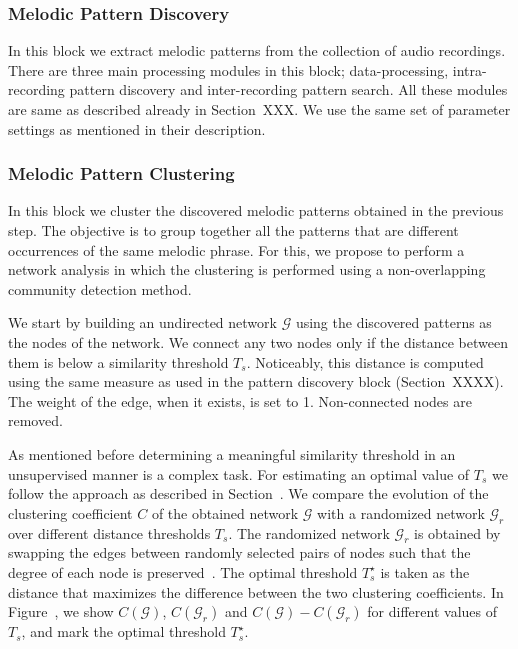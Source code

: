 \subsubsection{Melodic Pattern Discovery}
\label{sec:vsm_feature_extraction_pattern_discovery}
In this block we extract melodic patterns from the collection of audio recordings. There are three main processing modules in this block; data-processing, intra-recording pattern discovery and inter-recording pattern search. All these modules are same as described already in Section~XXX. We use the same set of parameter settings as mentioned in their description.

\subsubsection{Melodic Pattern Clustering}
\label{sec:vsm_feature_extraction_pattern_clustering}

In this block we cluster the discovered melodic patterns obtained in the previous step. The objective is to group together all the patterns that are different occurrences of the same melodic phrase. For this, we propose to perform a network analysis in which the clustering is performed using a non-overlapping community detection method. 

We start by building an undirected network $\mathcal{G}$ using the discovered patterns as the nodes of the network. We connect any two nodes only if the distance between them is below a similarity threshold $T_s$. Noticeably, this distance is computed using the same measure as used in the pattern discovery block (Section~XXXX). The weight of the edge, when it exists, is set to 1. Non-connected nodes are removed.

As mentioned before determining a meaningful similarity threshold in an unsupervised manner is a complex task. For estimating an optimal value of $T_s$ we follow the approach as described in Section~. We compare the evolution of the clustering coefficient $C$ of the obtained network $\mathcal{G}$ with a randomized network $\mathcal{G}_r$ over different distance thresholds $T_s$. The randomized network $\mathcal{G}_r$ is obtained by swapping the edges between randomly selected pairs of nodes such that the degree of each node is preserved~\cite{maslov2002specificity}. The optimal threshold $T_{s}^\star$ is taken as the distance that maximizes the difference between the two clustering coefficients.  In Figure~, we show $C(\mathcal{G})$, $C(\mathcal{G}_r)$ and $C(\mathcal{G})-C(\mathcal{G}_r)$ for different values of $T_{s}$, and mark the optimal threshold $T_{s}^\star$.

